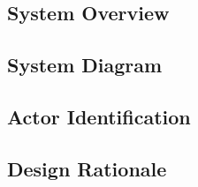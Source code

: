 \subsection{System Overview}
  

\subsection{System Diagram}
  

\subsection{Actor Identification}
  

\subsection{Design Rationale}
  
